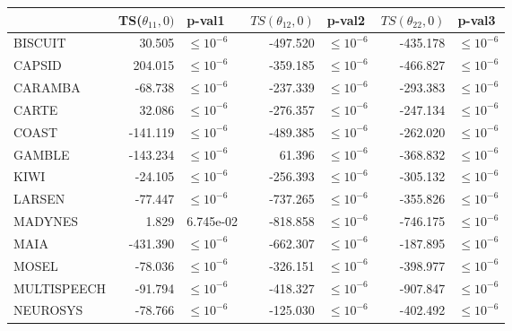 \begin{tabular}{lrlrlrl}
\toprule
{} &  TS($\theta_{11}, 0)$ &          p-val1 &  $TS(\theta_{12}, 0)$ &          p-val2 &  $TS(\theta_{22}, 0)$ &          p-val3 \\
\midrule
BISCUIT     &                30.505 &  $\leq 10^{-6}$ &              -497.520 &  $\leq 10^{-6}$ &              -435.178 &  $\leq 10^{-6}$ \\
CAPSID      &               204.015 &  $\leq 10^{-6}$ &              -359.185 &  $\leq 10^{-6}$ &              -466.827 &  $\leq 10^{-6}$ \\
CARAMBA     &               -68.738 &  $\leq 10^{-6}$ &              -237.339 &  $\leq 10^{-6}$ &              -293.383 &  $\leq 10^{-6}$ \\
CARTE       &                32.086 &  $\leq 10^{-6}$ &              -276.357 &  $\leq 10^{-6}$ &              -247.134 &  $\leq 10^{-6}$ \\
COAST       &              -141.119 &  $\leq 10^{-6}$ &              -489.385 &  $\leq 10^{-6}$ &              -262.020 &  $\leq 10^{-6}$ \\
GAMBLE      &              -143.234 &  $\leq 10^{-6}$ &                61.396 &  $\leq 10^{-6}$ &              -368.832 &  $\leq 10^{-6}$ \\
KIWI        &               -24.105 &  $\leq 10^{-6}$ &              -256.393 &  $\leq 10^{-6}$ &              -305.132 &  $\leq 10^{-6}$ \\
LARSEN      &               -77.447 &  $\leq 10^{-6}$ &              -737.265 &  $\leq 10^{-6}$ &              -355.826 &  $\leq 10^{-6}$ \\
MADYNES     &                 1.829 &       6.745e-02 &              -818.858 &  $\leq 10^{-6}$ &              -746.175 &  $\leq 10^{-6}$ \\
MAIA        &              -431.390 &  $\leq 10^{-6}$ &              -662.307 &  $\leq 10^{-6}$ &              -187.895 &  $\leq 10^{-6}$ \\
MOSEL       &               -78.036 &  $\leq 10^{-6}$ &              -326.151 &  $\leq 10^{-6}$ &              -398.977 &  $\leq 10^{-6}$ \\
MULTISPEECH &               -91.794 &  $\leq 10^{-6}$ &              -418.327 &  $\leq 10^{-6}$ &              -907.847 &  $\leq 10^{-6}$ \\
NEUROSYS    &               -78.766 &  $\leq 10^{-6}$ &              -125.030 &  $\leq 10^{-6}$ &              -402.492 &  $\leq 10^{-6}$ \\

\end{tabular}
